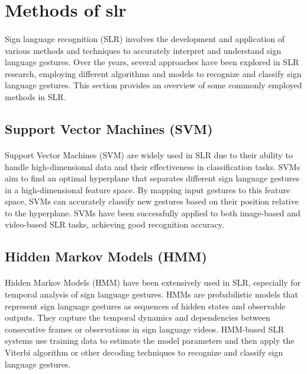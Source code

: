 \section{Methods of \ac{slr}}
\paragraph{}
Sign language recognition (SLR) involves the development and application of various methods and techniques to accurately interpret and understand sign language gestures. Over the years, several approaches have been explored in SLR research, employing different algorithms and models to recognize and classify sign language gestures. This section provides an overview of some commonly employed methods in SLR.

\subsection{Support Vector Machines (SVM)}
\paragraph{}
Support Vector Machines (SVM) are widely used in SLR due to their ability to handle high-dimensional data and their effectiveness in classification tasks. SVMs aim to find an optimal hyperplane that separates different sign language gestures in a high-dimensional feature space. By mapping input gestures to this feature space, SVMs can accurately classify new gestures based on their position relative to the hyperplane. SVMs have been successfully applied to both image-based and video-based SLR tasks, achieving good recognition accuracy.

\subsection{Hidden Markov Models (HMM)}
\paragraph{}
Hidden Markov Models (HMM) have been extensively used in SLR, especially for temporal analysis of sign language gestures. HMMs are probabilistic models that represent sign language gestures as sequences of hidden states and observable outputs. They capture the temporal dynamics and dependencies between consecutive frames or observations in sign language videos. HMM-based SLR systems use training data to estimate the model parameters and then apply the Viterbi algorithm or other decoding techniques to recognize and classify sign language gestures.


